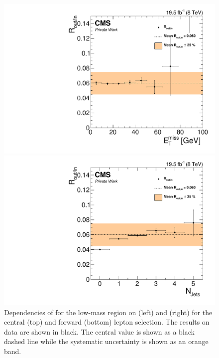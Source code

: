 \begin{figure}[htbp]
\begin{minipage}[t]{0.49\textwidth}
  \includegraphics[width=\textwidth]{plots/BG/rOutIn/rOutInSyst_DrellYanControlForward_Full2012_MET_LowMass_SF_None.pdf}
\end{minipage}
\begin{minipage}[t]{0.49\textwidth}
\includegraphics[width=\textwidth]{plots/BG/rOutIn/rOutInSyst_DrellYanControlForward_Full2012_NJets_LowMass_SF_None.pdf}
\end{minipage}
\caption{Dependencies of \Routin for the low-mass region on \MET (left) and \njets (right) for the central (top) and forward (bottom) lepton selection. The results on data are shown in black. The central value is shown as a black dashed line while the systematic uncertainty is shown as an orange band.}
\label{fig:ROutInDependencies}
\end{figure} 


